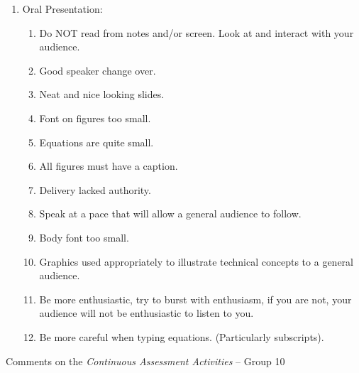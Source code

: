 \documentclass[14pt,twoside]{report}
\begin{document}
\begin{enumerate}
\item Oral Presentation:
\begin{enumerate}
%
\item Do NOT read from notes and/or screen. Look at and interact with your audience.
%
\item Good speaker change over. 
%
\item Neat and nice looking slides.
%
\item Font on figures too small.
%
\item Equations are quite small.
%
\item All figures must have a caption.
%
\item Delivery lacked authority.
%
\item Speak at a pace that will allow a general audience to follow.
%
\item Body font too small.
%
\item Graphics used appropriately to illustrate technical concepts to a general audience.
%
\item Be more enthusiastic, try to burst with enthusiasm, if you are not, your audience will not be enthusiastic to listen to you.
%
\item Be more careful when typing equations. (Particularly subscripts).
%
\end{enumerate}

\end{enumerate}


\clearpage



\bigskip

\begin{center}
  {\Large Comments on the {\it Continuous Assessment Activities} -- Group 10}
\end{center}
\end{document}
